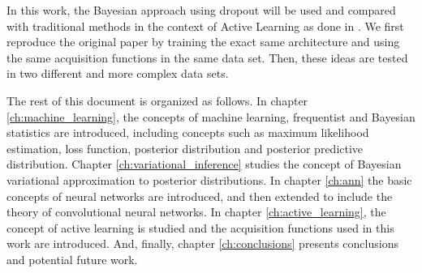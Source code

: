 In this work, the Bayesian approach using dropout will be used and compared with traditional methods in the context of Active Learning as done in \cite{Gal2016Active}. We first reproduce the original paper by training the exact same architecture and using the same acquisition functions in the same data set. Then, these ideas are tested in two different and more complex data sets.

The rest of this document is organized as follows. In chapter \ref{ch:machine_learning}, the concepts of machine learning, frequentist and Bayesian statistics are introduced, including concepts such as maximum likelihood estimation, loss function, posterior distribution and posterior predictive distribution. Chapter \ref{ch:variational_inference} studies the concept of Bayesian variational approximation to posterior distributions. In chapter \ref{ch:ann} the basic concepts of neural networks are introduced, and then extended to include the theory of convolutional neural networks. In chapter \ref{ch:active_learning}, the concept of active learning is studied and the acquisition functions used in this work are introduced. And, finally, chapter \ref{ch:conclusions} presents conclusions and potential future work.
